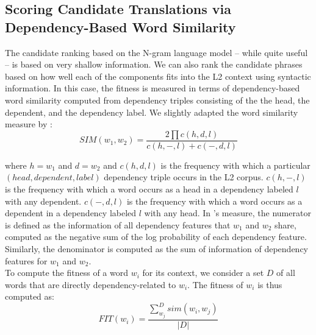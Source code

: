 \documentclass[11pt,a4paper]{article}
\begin{document}
\subsection{Scoring Candidate Translations via Dependency-Based Word Similarity}
\label{sec:dependencySIM}
The candidate ranking based on the N-gram language model -- while quite useful
-- is based on very
shallow information. We can also rank the candidate phrases based on how well
each of the components fits into the L2 context using syntactic information.
In this case, the fitness is measured in terms of dependency-based word
similarity computed from dependency triples consisting of the the head, the
dependent, and the dependency label. We slightly adapted the word similarity
measure by :
\begin{equation}
SIM(w_1,w_2) = \frac{2 \prod c(h,d,l)} 
{c(h,-,l) + c(-,d,l)}
\end{equation}

\noindent
where $h=w_1$ and $d=w_2$ and 
$c(h,d,l)$ is the frequency with which a particular $(head, dependent, label)$
dependency triple occurs in the L2 corpus.
$c(h,-,l)$ is the frequency with which a word occurs as a head in a dependency
labeled $l$ with any dependent. $c(-,d,l)$ is the frequency with which a word
occurs as a dependent in a dependency labeled $l$  with any head. 
In \cite{lin:98}'s measure, the numerator is defined as the information of all dependency features that $w_1$ and $w_2$ share, computed as the negative sum of the log probability of each dependency feature. Similarly, the denominator is computed as the sum of information of dependency features for $w_1$ and $w_2$. \\

To compute the fitness of a word $w_i$ for its context, we consider a set $D$ of all words that are directly dependency-related to $w_i$. The fitness of $w_i$ is thus computed as:\\
\begin{equation}
FIT(w_i) =  \frac {  \sum_{w_j}^{D} sim(w_i,w_j) } {  |D|}
\end{equation}
\end{document}
